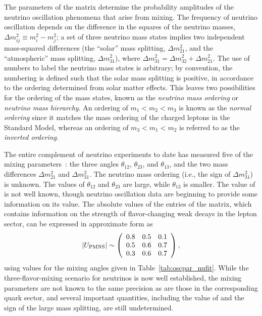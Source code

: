 The parameters of the 
matrix determine the probability amplitudes of the neutrino
oscillation phenomena that arise from mixing.  The frequency of neutrino oscillation 
depends on the difference in the squares of the neutrino
masses, $\Delta m^{2}_{ij} \equiv m^{2}_{i} - m^{2}_{j}$; a set of three
neutrino mass states implies two independent mass-squared differences
(the ``solar'' mass splitting, $\Delta m^{2}_{21}$, and the ``atmospheric'' mass splitting, 
$\Delta m^{2}_{31}$), where $\Delta m^{2}_{31} = \Delta m^{2}_{32} + \Delta m^{2}_{21}$. 
The use of numbers to label the neutrino mass states is arbitrary; by convention, the numbering is defined such that the solar mass splitting is positive, in accordance to the ordering determined from solar matter effects.
This leaves two possibilities for
the ordering of the
mass states, known as the \emph{neutrino mass ordering} or \emph{neutrino mass hierarchy}. An ordering of
$m_1 < m_2 < m_3$ is known as the \emph{normal ordering} since it matches
the mass ordering of the charged leptons in the Standard Model, whereas an ordering of $m_3 < m_1 < m_2$
is referred to as the \emph{inverted ordering}.

The entire complement of neutrino experiments to date has measured
five of the mixing parameters~\cite{Esteban:2018azc,deSalas:2017kay,Capozzi:2017yic}: the three angles $\theta_{12}$,
$\theta_{23}$, and $\theta_{13}$, and the two mass differences
$\Delta m^{2}_{21}$ and $\Delta m^{2}_{31}$. 
The neutrino mass ordering (i.e., the sign of $\Delta m^{2}_{31}$) is unknown.
The values of $\theta_{12}$ and $\theta_{23}$ are large, while 
$\theta_{13}$ is smaller. The value of \deltacp is not well known, though neutrino oscillation data are beginning to provide some information on its value.
The absolute values of the entries of the  matrix, which
contains information on the strength of flavor-changing weak decays in
the lepton sector, can be expressed in approximate form as
\begin{equation}
|U_{\rm PMNS}|\sim \left(\begin{array}{ccc} 0.8 & 0.5 & 0.1 \\ 0.5 & 0.6 & 0.7 \\ 0.3 & 0.6 & 0.7\end{array} \right),
\label{eq:pmnsmatrix}
\end{equation}
using values for the mixing angles given in Table~\ref{tab:oscpar_nufit}. 
While the three-flavor-mixing scenario for neutrinos is now well
established, the mixing parameters are not known to the same precision 
as are those in the
corresponding quark sector, and several important quantities, including
the value of \deltacp and the sign of the large mass splitting, are
still undetermined.

